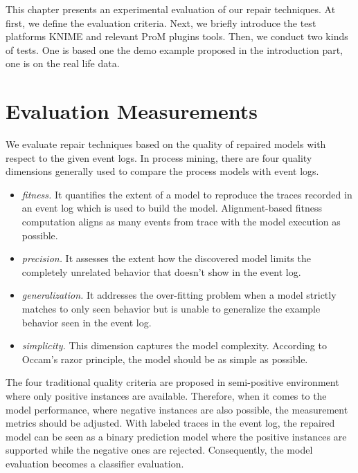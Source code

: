 This chapter presents an experimental evaluation of our repair techniques. At first, we define the evaluation criteria. Next, we briefly introduce the test platforms KNIME and relevant ProM plugins tools. Then, we conduct two kinds of tests. One is based one the demo example proposed in the introduction part, one is on the real life data. 
\section{Evaluation Measurements}
We evaluate repair techniques based on the quality of repaired models with respect to the given event logs. In process mining, there are four quality dimensions generally used to compare the process models with event logs. 
\begin{itemize}
	\item \emph{fitness.} It quantifies the extent of a model to reproduce the traces recorded in an event log which is used to build the model. Alignment-based fitness computation aligns as many events from trace with the model execution as possible.  
	\item \emph{precision.} It assesses the extent how the discovered model limits the completely unrelated behavior that doesn't show in the event log. 
	\item \emph{generalization.} It addresses the over-fitting problem when a model strictly matches to only seen behavior but is unable to generalize the example behavior seen in the event log. 
	\item \emph{simplicity.} This dimension captures the model complexity. According to Occam's razor principle, the model should be as simple as possible.
\end{itemize}
The four traditional quality criteria are proposed in semi-positive environment where only positive instances are available. Therefore, when it comes to the model performance, where negative instances are also possible, the measurement metrics should be adjusted. With labeled traces in the event log, the repaired model can be seen as a binary prediction model where the positive instances are supported while the negative ones are rejected. Consequently, the model evaluation becomes a classifier evaluation. 

